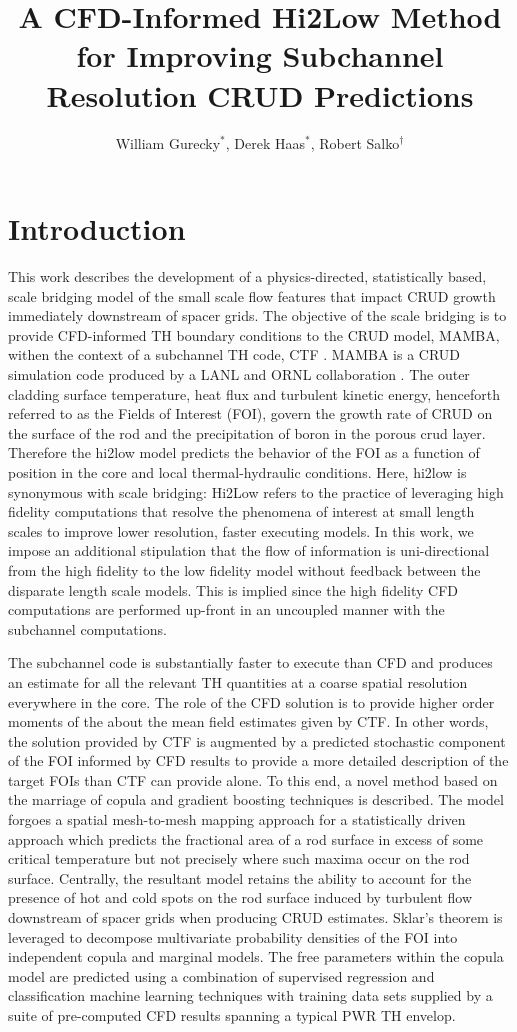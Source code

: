 \documentclass{anstrans}
\title{A CFD-Informed Hi2Low Method for Improving Subchannel Resolution CRUD Predictions}
\author{William Gurecky$^{*}$, Derek Haas$^{*}$, Robert Salko$^{\dagger}$}
\institute{
$^{*}$The University of Texas at Austin
\and
$^{\dagger}$Oak Ridge National Laboratory, P.O.\ Box 2008,
Oak Ridge, TN
}
\begin{document}
\section{Introduction}

This work describes the development of a physics-directed, statistically based,
scale bridging model of the small scale flow features that impact CRUD growth immediately downstream of spacer grids. The objective of the scale bridging
is to provide CFD-informed TH boundary conditions to the CRUD model, MAMBA, withen the context of a subchannel TH code, CTF \cite{salko12}.  MAMBA is a CRUD simulation code produced by a LANL and ORNL collaboration \cite{collins16}. 
The outer cladding surface temperature, heat
flux and turbulent kinetic energy, henceforth referred to as the Fields of Interest (FOI),
govern the growth rate of CRUD on the surface of the rod and the
precipitation of boron in the porous crud layer. Therefore the hi2low model predicts the behavior of the
FOI as a function of position in the core and local thermal-hydraulic conditions.  Here, hi2low is synonymous with scale bridging: Hi2Low refers to the practice of leveraging high fidelity computations that resolve the phenomena of interest at small length scales to improve lower resolution, faster executing models.  In this work, we impose an additional stipulation that the flow of information is uni-directional from the high fidelity to the low fidelity model without feedback between the disparate length scale models.  This is implied since the high fidelity CFD computations are performed up-front in an uncoupled manner with the subchannel computations.

The subchannel code is substantially faster to execute than CFD
and produces an estimate for all the relevant TH quantities at a coarse spatial resolution everywhere in
the core. The role of the CFD solution is to provide higher order moments of the about the mean field estimates
given by CTF. In other words, the solution provided by CTF is augmented by a predicted stochastic
component of the FOI informed by CFD results to provide a more detailed description of the target
FOIs than CTF can provide alone. To this end, a novel method based on the marriage of copula and
gradient boosting techniques is described. The model forgoes a spatial mesh-to-mesh mapping approach
for a statistically driven approach which predicts the fractional area of a rod surface in excess of some
critical temperature but not precisely where such maxima occur on the rod surface.
Centrally, the resultant model retains the ability to account for the presence
of hot and cold spots on the rod surface induced by turbulent flow downstream of spacer grids when
producing CRUD estimates. Sklar's theorem is leveraged to decompose multivariate probability densities
of the FOI into independent copula and marginal models. The free parameters within the copula model
are predicted using a combination of supervised regression and classification machine learning techniques
with training data sets supplied by a suite of pre-computed CFD results spanning a typical PWR TH
envelop.  
\end{document}
